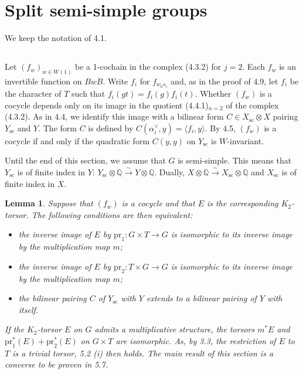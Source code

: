 \documentclass[11pt,a4paper]{article}
\theoremstyle{plain}
\newtheorem{lemma}[theorem]{Lemma}
\theoremstyle{definition}
\newcommand{\bQ}{\mathbb{Q}}
\newcommand{\scu}{\mathrm{sc}}
\newcommand{\pr}{\mathrm{pr}}
\begin{document}
\section{Split semi-simple groups}

We keep the notation of 4.1.

\subsection{}
Let $(f_w)_{w \in W(1)}$ be a 1-cochain in the complex (4.3.2) for $j=2$. Each $f_w$ is an invertible function on $BwB$. Write $f_i$ for $f_{w_0 s_i}$ and, as in the proof of 4.9, let $f_i$ be the character of $T$ such that $f_i(gt) = f_i(g) f_i(t)$. Whether $(f_w)$ is a cocycle depends only on its image in the quotient (4.4.1)$_{n=2}$ of the complex (4.3.2). As in 4.4, we identify this image with a bilinear form $C \in X_\scu \otimes X$ pairing $Y_\scu$ and $Y$. The form $C$ is defined by $C(\alpha_i^\vee, y) = \langle f_i, y \rangle$. By 4.5, $(f_w)$ is a cocycle if and only if the quadratic form $C(y,y)$ on $Y_\scu$ is $W$-invariant.

Until the end of this section, we assume that $G$ is semi-simple. This means that $Y_\scu$ is of finite index in $Y$: $Y_\scu \otimes \bQ \xrightarrow{\sim} Y \otimes \bQ$. Dually, $X \otimes \bQ \xrightarrow{\sim} X_\scu \otimes \bQ$ and $X_\scu$ is of finite index in $X$.

\begin{lemma}\label{lem:5.2}
Suppose that $(f_w)$ is a cocycle and that $E$ is the corresponding $K_2$-torsor. The following conditions are then equivalent:
\begin{itemize}
\item[(i)] the inverse image of $E$ by $\pr_1: G \times T \to G$ is isomorphic to its inverse image by the multiplication map $m$;
\item[(ii)] the inverse image of $E$ by $\pr_2: T \times G \to G$ is isomorphic to its inverse image by the multiplication map $m$;
\item[(iii)] the bilinear pairing $C$ of $Y_\scu$ with $Y$ extends to a bilinear pairing of $Y$ with itself.
\end{itemize}
If the $K_2$-torsor $E$ on $G$ admits a multiplicative structure, the torsors $m^* E$ and $\pr_1^*(E) + \pr_2^*(E)$ on $G \times T$ are isomorphic. As, by 3.3, the restriction of $E$ to $T$ is a trivial torsor, 5.2 (i) then holds. The main result of this section is a converse to be proven in 5.7.
\end{lemma}
\end{document}
